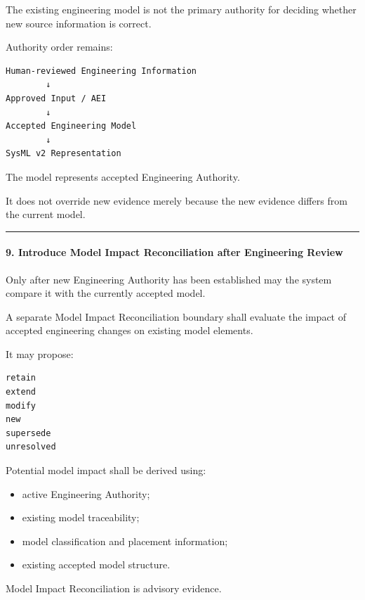 The existing engineering model is not the primary authority for deciding whether new source information is correct.

Authority order remains:

\begin{verbatim}
Human-reviewed Engineering Information
        ↓
Approved Input / AEI
        ↓
Accepted Engineering Model
        ↓
SysML v2 Representation
\end{verbatim}

The model represents accepted Engineering Authority.

It does not override new evidence merely because the new evidence differs from the current model.

\begin{center}\rule{0.5\linewidth}{0.5pt}\end{center}

\hypertarget{9-introduce-model-impact-reconciliation-after-engineering-review}{%
\paragraph{9. Introduce Model Impact Reconciliation after Engineering Review}\label{9-introduce-model-impact-reconciliation-after-engineering-review}}

Only after new Engineering Authority has been established may the system compare it with the currently accepted model.

A separate Model Impact Reconciliation boundary shall evaluate the impact of accepted engineering changes on existing model elements.

It may propose:

\begin{verbatim}
retain
extend
modify
new
supersede
unresolved
\end{verbatim}

Potential model impact shall be derived using:

\begin{itemize}
\tightlist
\item
  active Engineering Authority;
\item
  existing model traceability;
\item
  model classification and placement information;
\item
  existing accepted model structure.
\end{itemize}

Model Impact Reconciliation is advisory evidence.

